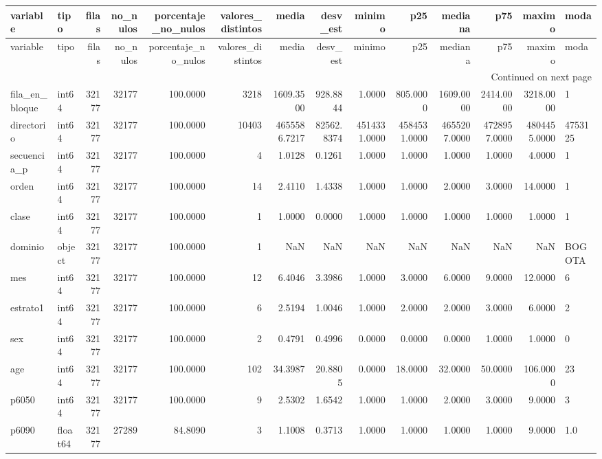 \begin{longtable}{llrrrrrrrrrrrl}
\toprule
variable & tipo & filas & no\_nulos & porcentaje\_no\_nulos & valores\_distintos & media & desv\_est & minimo & p25 & mediana & p75 & maximo & moda \\
\midrule
\endfirsthead
\toprule
variable & tipo & filas & no\_nulos & porcentaje\_no\_nulos & valores\_distintos & media & desv\_est & minimo & p25 & mediana & p75 & maximo & moda \\
\midrule
\endhead
\midrule
\multicolumn{14}{r}{Continued on next page} \\
\midrule
\endfoot
\bottomrule
\endlastfoot
fila\_en\_bloque & int64 & 32177 & 32177 & 100.0000 & 3218 & 1609.3500 & 928.8844 & 1.0000 & 805.0000 & 1609.0000 & 2414.0000 & 3218.0000 & 1 \\
directorio & int64 & 32177 & 32177 & 100.0000 & 10403 & 4655586.7217 & 82562.8374 & 4514331.0000 & 4584531.0000 & 4655207.0000 & 4728957.0000 & 4804455.0000 & 4753125 \\
secuencia\_p & int64 & 32177 & 32177 & 100.0000 & 4 & 1.0128 & 0.1261 & 1.0000 & 1.0000 & 1.0000 & 1.0000 & 4.0000 & 1 \\
orden & int64 & 32177 & 32177 & 100.0000 & 14 & 2.4110 & 1.4338 & 1.0000 & 1.0000 & 2.0000 & 3.0000 & 14.0000 & 1 \\
clase & int64 & 32177 & 32177 & 100.0000 & 1 & 1.0000 & 0.0000 & 1.0000 & 1.0000 & 1.0000 & 1.0000 & 1.0000 & 1 \\
dominio & object & 32177 & 32177 & 100.0000 & 1 & NaN & NaN & NaN & NaN & NaN & NaN & NaN & BOGOTA \\
mes & int64 & 32177 & 32177 & 100.0000 & 12 & 6.4046 & 3.3986 & 1.0000 & 3.0000 & 6.0000 & 9.0000 & 12.0000 & 6 \\
estrato1 & int64 & 32177 & 32177 & 100.0000 & 6 & 2.5194 & 1.0046 & 1.0000 & 2.0000 & 2.0000 & 3.0000 & 6.0000 & 2 \\
sex & int64 & 32177 & 32177 & 100.0000 & 2 & 0.4791 & 0.4996 & 0.0000 & 0.0000 & 0.0000 & 1.0000 & 1.0000 & 0 \\
age & int64 & 32177 & 32177 & 100.0000 & 102 & 34.3987 & 20.8805 & 0.0000 & 18.0000 & 32.0000 & 50.0000 & 106.0000 & 23 \\
p6050 & int64 & 32177 & 32177 & 100.0000 & 9 & 2.5302 & 1.6542 & 1.0000 & 1.0000 & 2.0000 & 3.0000 & 9.0000 & 3 \\
p6090 & float64 & 32177 & 27289 & 84.8090 & 3 & 1.1008 & 0.3713 & 1.0000 & 1.0000 & 1.0000 & 1.0000 & 9.0000 & 1.0 \\

\end{longtable}

